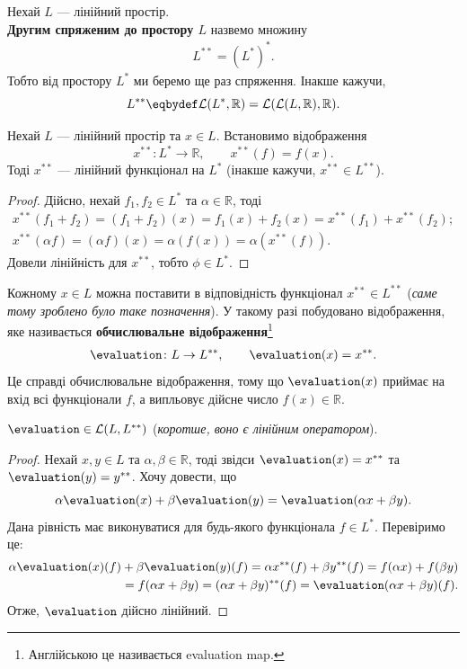 \documentclass{math_library}
\begin{document}
\begin{definition}
Нехай $L$ --- лінійний простір.\\
\textbf{Другим спряженим до простору $L$} назвемо множину
\begin{align*}
L^{**} = (L^*)^*.
\end{align*}
Тобто від простору $L^*$ ми беремо ще раз спряження. Інакше кажучи,
\[ 
L^{**} \eqbydef \mathcal{L}(L^*,\mathbb{R}) = \mathcal{L}(\mathcal{L}(L,\mathbb{R}),\mathbb{R}).
\]
\end{definition}

\begin{proposition}
Нехай $L$ --- лінійний простір та $x \in L$. Встановимо відображення 
\[
x^{**} \colon L^* \to \mathbb{R}, \qquad x^{**}(f) = f(x).
\]
Тоді $x^{**}$ --- лінійний функціонал на $L^*$ (інакше кажучи, $x^{**} \in L^{**}$).
\end{proposition}

\begin{proof}
Дійсно, нехай $f_1,f_2 \in L^*$ та $\alpha \in \mathbb{R}$, тоді
\begin{align*}
x^{**}(f_1+f_2) = (f_1+f_2)(x) = f_1(x) + f_2(x) = x^{**}(f_1) + x^{**}(f_2); \\
x^{**}(\alpha f) = (\alpha f)(x) = \alpha (f(x)) = \alpha (x^{**}(f)).
\end{align*}
Довели лінійність для $x^{**}$, тобто $\phi \in L^*$.
\end{proof}

\begin{remark}
Кожному $x \in L$ можна поставити в відповідність функціонал $x^{**} \in L^{**}$ (\textit{саме тому зроблено було таке позначення}). У такому разі побудовано відображення, яке називається \textbf{обчислювальне відображення}\footnote{Англійською це називається evaluation map.}
\begin{align*}
\evaluation \colon L \to L^{**}, \qquad \evaluation(x) = x^{**}.
\end{align*}
Це справді обчислювальне відображення, тому що $\evaluation(x)$ приймає на вхід всі функціонали $f$, а випльовує дійсне число $f(x) \in \mathbb{R}$.
\end{remark}

\begin{proposition}
$\evaluation \in \mathcal{L}(L,L^{**})$ (\textit{коротше, воно є лінійним оператором}).
\end{proposition}

\begin{proof}
Нехай $x,y \in L$ та $\alpha,\beta \in \mathbb{R}$, тоді звідси $\evaluation(x) = x^{**}$ та $\evaluation(y) = y^{**}$. Хочу довести, що
\[
\alpha \evaluation(x) + \beta \evaluation(y) = \evaluation(\alpha x+ \beta y).
\]
Дана рівність має виконуватися для будь-якого функціонала $f \in L^*$. Перевіримо це:
\begin{align*}
\alpha \evaluation(x)(f) + \beta \evaluation(y)(f) = \alpha x^{**}(f) + \beta y^{**}(f) = f(\alpha x) + f(\beta y) \\
= f(\alpha x+ \beta y) = (\alpha x+ \beta y)^{**}(f) = \evaluation(\alpha x+\beta y)(f).
\end{align*}
Отже, $\evaluation$ дійсно лінійний.
\end{proof}
\end{document}
